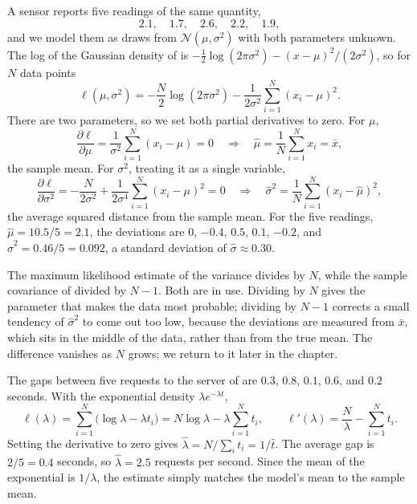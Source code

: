 \begin{example}[Gaussian]
  \label{ex:ch06-mle-gaussian}
  A sensor reports five readings of the same quantity,
  \[
    2.1, \quad 1.7, \quad 2.6, \quad 2.2, \quad 1.9 ,
  \]
  and we model them as draws from $\mathcal{N}(\mu, \sigma^2)$ with both
  parameters unknown. The log of the Gaussian density of
   is $-\tfrac12\log(2\pi\sigma^2) - (x -
  \mu)^2/(2\sigma^2)$, so for $N$ data points
  \[
    \ell(\mu, \sigma^2) = -\frac{N}{2}\log(2\pi\sigma^2)
      - \frac{1}{2\sigma^2}\sum_{i=1}^{N} (x_i - \mu)^2 .
  \]
  There are two parameters, so we set both partial derivatives to zero.
  For $\mu$,
  \[
    \frac{\partial \ell}{\partial \mu}
    = \frac{1}{\sigma^2} \sum_{i=1}^{N} (x_i - \mu) = 0
    \quad\Longrightarrow\quad
    \hat\mu = \frac{1}{N}\sum_{i=1}^{N} x_i = \bar{x} ,
  \]
  the sample mean. For $\sigma^2$, treating it as a single variable,
  \[
    \frac{\partial \ell}{\partial \sigma^2}
    = -\frac{N}{2\sigma^2} + \frac{1}{2\sigma^4}\sum_{i=1}^{N} (x_i - \mu)^2
    = 0
    \quad\Longrightarrow\quad
    \hat\sigma^2 = \frac{1}{N}\sum_{i=1}^{N} (x_i - \hat\mu)^2 ,
  \]
  the average squared distance from the sample mean. For the five
  readings, $\hat\mu = 10.5/5 = 2.1$, the deviations are $0$, $-0.4$,
  $0.5$, $0.1$, $-0.2$, and $\hat\sigma^2 = 0.46/5 = 0.092$, a standard
  deviation of $\hat\sigma \approx 0.30$.
\end{example}

The maximum likelihood estimate of the variance divides by $N$, while
the sample covariance of  divided by $N -
1$. Both are in use. Dividing by $N$ gives the parameter that makes the
data most probable; dividing by $N - 1$ corrects a small tendency of
$\hat\sigma^2$ to come out too low, because the deviations are measured
from $\bar{x}$, which sits in the middle of the data, rather than from
the true mean. The difference vanishes as $N$ grows; we return to it
later in the chapter.

\begin{example}[Exponential]
  \label{ex:ch06-mle-exponential}
  The gaps between five requests to the server of
   are $0.3$, $0.8$, $0.1$, $0.6$, and $0.2$
  seconds. With the exponential density $\lambda e^{-\lambda t}$,
  \[
    \ell(\lambda) = \sum_{i=1}^{N} \bigl(\log\lambda - \lambda t_i\bigr)
    = N\log\lambda - \lambda \sum_{i=1}^{N} t_i ,
    \qquad
    \ell'(\lambda) = \frac{N}{\lambda} - \sum_{i=1}^{N} t_i .
  \]
  Setting the derivative to zero gives $\hat\lambda = N / \sum_i t_i =
  1/\bar{t}$. The average gap is $2/5 = 0.4$ seconds, so $\hat\lambda =
  2.5$ requests per second. Since the mean of the exponential is
  $1/\lambda$, the estimate simply matches the model's mean to the
  sample mean.
\end{example}

